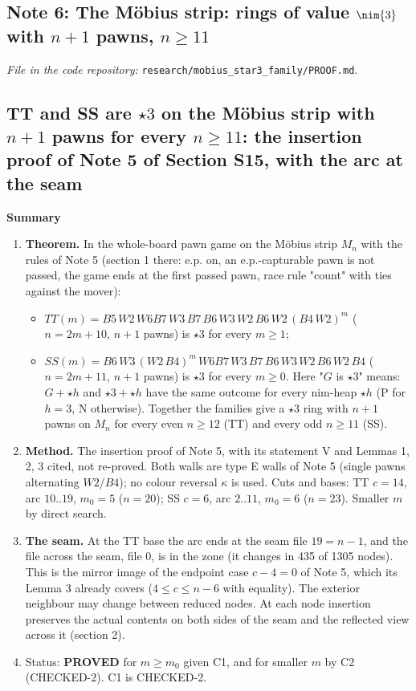 \subsection{Note 6: The M\"obius strip: rings of value $\nim{3}$ with $n+1$ pawns, $n\ge11$}

\noindent\emph{File in the code repository:} \texttt{research/mobius\_star3\_family/PROOF.md}.\par


\subsection*{TT and SS are $\star3$ on the Möbius strip with $n+1$ pawns for every $n\ge11$: the insertion proof of Note 5 of Section S15, with the arc at the seam}
\textbf{Summary}

\begin{enumerate}
\item \textbf{Theorem.} In the whole-board pawn game on the Möbius strip $M_n$ with the rules of Note 5 (section 1 there: e.p. on, an e.p.-capturable pawn is not passed, the game ends at the first passed pawn, race rule "count" with ties against the mover):
\begin{itemize}
\item $TT(m)=B5\,W2\,W6B7\,W3\,B7\,B6\,W3\,W2\,B6\,W2\,(B4\,W2)^m$ ($n=2m+10$, $n+1$ pawns) is $\star3$ for every $m\ge1$;
\item $SS(m)=B6\,W3\,(W2\,B4)^m\,W6B7\,W3\,B7\,B6\,W3\,W2\,B6\,W2\,B4$ ($n=2m+11$, $n+1$ pawns) is $\star3$ for every $m\ge0$.
Here "$G$ is $\star3$" means: $G+\star h$ and $\star3+\star h$ have the same outcome for every nim-heap $\star h$ (P for $h=3$, N otherwise). Together the families give a $\star3$ ring with $n+1$ pawns on $M_n$ for every even $n\ge12$ (TT) and every odd $n\ge11$ (SS).
\end{itemize}
\item \textbf{Method.} The insertion proof of Note 5, with its statement V and Lemmas 1, 2, 3 cited, not re-proved. Both walls are type E walls of Note 5 (single pawns alternating $W2$/$B4$); no colour reversal $\kappa$ is used. Cuts and bases: TT $c=14$, arc $10..19$, $m_0=5$ ($n=20$); SS $c=6$, arc $2..11$, $m_0=6$ ($n=23$). Smaller $m$ by direct search.
\item \textbf{The seam.} At the TT base the arc ends at the seam file $19=n-1$, and the file across the seam, file 0, is in the zone (it changes in 435 of 1305 nodes). This is the mirror image of the endpoint case $c-4=0$ of Note 5, which its Lemma 3 already covers ($4\le c\le n-6$ with equality). The exterior neighbour may change between reduced nodes. At each node insertion preserves the actual contents on both sides of the seam and the reflected view across it (section 2).
\item Status: \textbf{PROVED} for $m\ge m_0$ given C1, and for smaller $m$ by C2 (CHECKED-2). C1 is CHECKED-2.
\end{enumerate}
